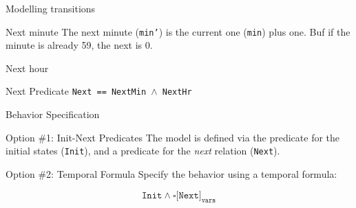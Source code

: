 \begin{frame}{Modelling transitions}
    \begin{block}{Next minute}
        The next minute (\texttt{min'}) is the current one (\texttt{min}) plus one. Buf if the minute is already 59, the next is 0.
    \end{block}
    \pause
    \begin{block}{Next hour}
    \end{block}
    \begin{block}{Next Predicate}
        \texttt{Next == NextMin $\land$ NextHr}
    \end{block}
\end{frame}

\begin{frame}{Behavior Specification}
    \begin{block}{Option \#1: Init-Next Predicates}
        The model is defined via the predicate for the initial states (\texttt{Init}), and a predicate for the \emph{next} relation (\texttt{Next}).
    \end{block}
    \pause
    \begin{block}{Option \#2: Temporal Formula}
        Specify the behavior using a temporal formula:

        \[
            \texttt{Init} \land \square \texttt{[Next]}_{\texttt{vars}}
        \]
    \end{block}
\end{frame}

